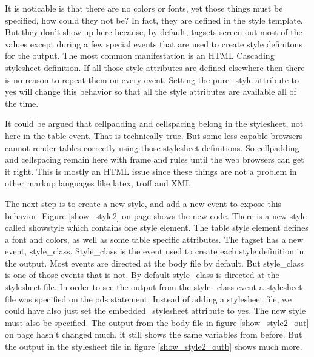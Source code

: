 It is noticable is that there are no colors or fonts, yet
those things must be specified, how could they not be?
In fact, they are defined in the style template.  But they don't show
up here because, by default, tagsets screen out most of the values 
except during a few special events that are used to create style definitons
for the output.  The most common manifestation is an HTML Cascading stylesheet
definition.  If all those style attributes are defined elsewhere then
there is no reason to repeat them on every event.  Setting the pure\_style
attribute to yes will change this behavior so that all the style attributes
are available all of the time.  


It could be argued
that cellpadding and cellspacing belong in the stylesheet,
not here in the table event.  That is technically true.  But some less
capable browsers cannot render tables correctly
using those stylesheet definitions.  So cellpadding and cellspacing remain
here with frame and rules until the web browsers can get it right.  This is
mostly an HTML issue since these things are not a problem in other markup
languages like latex, troff and XML.

The next step is to create a new style, and add a new event to expose this
behavior.  Figure \ref{show_style2} on page \pageref{show_style2} shows
the new code.  There is a new style called showstyle which contains one
style element.  The table style element defines a font and colors, as
well as some table specific attributes.  The tagset has a new event,
style\_class.  Style\_class is the event used to create each style
definition in the output.  Most events are directed at the body
file by default.  But style\_class is one of those events that is not.
By default style\_class is directed at the stylesheet file.  In order
to see the output from the style\_class event a stylesheet file was specified
on the ods statement.  Instead of adding a stylesheet file, we could have also
just set the embedded\_stylesheet attribute to yes.
The new style must also be specified.  The
output from the body file in figure \ref{show_style2_out} on page \pageref{show_style2_out}
hasn't changed much, it still shows the same variables from before.
But the output in the stylesheet file in figure \ref{show_style2_outb} shows much more.


